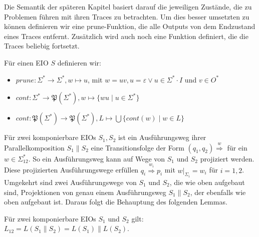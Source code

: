 Die Semantik der späteren Kapitel basiert darauf die jeweiligen Zustände, die
zu Problemen führen mit ihren Traces zu betrachten. Um dies besser umsetzten zu
können definieren wir eine prune-Funktion, die alle Outputs von dem Endzustand
eines Traces entfernt. Zusätzlich wird auch noch eine Funktion definiert, die
die Traces beliebig fortsetzt.

\begin{Def}
  Für einen EIO $S$ definieren wir:
  \begin{itemize}
    \item $prune:\Sigma ^*\rightarrow\Sigma ^*, w\mapsto u$, mit $w=uv,
      u=\varepsilon\vee u\in\Sigma ^*\cdot I$ und $v\in O^*$
    \item $cont:\Sigma ^*\rightarrow\mathfrak{P}(\Sigma ^*),
      w\mapsto\{wu\mid u\in\Sigma ^*\}$
    \item $cont:\mathfrak{P}(\Sigma ^*)\rightarrow\mathfrak{P}(\Sigma ^*),
      L\mapsto\bigcup\{cont(w)\mid w\in L\}$
  \end{itemize}
\end{Def}

Für zwei komponierbare EIOs $S_1, S_2$ ist ein Ausführungsweg ihrer
Parallelkomposition $S_1\| S_2$ eine Transitionsfolge der Form $(q_1,q_2)
\overset{w}{\Rightarrow}$ für ein $w\in\Sigma_{12}^*$. So ein Ausführungsweg
kann auf Wege von $S_1$ und $S_2$ projiziert werden. Diese projizierten
Ausführungswege erfüllen $q_i \overset{w_i}{\Rightarrow} p_i$ mit $w|_{\Sigma
_i}=w_i$ für $i=1,2$. Umgekehrt sind zwei Ausführungswege von $S_1$ und $S_2$,
die wie oben aufgebaut sind, Projektionen von genau einem Ausführungsweg
$S_1\|S_2$, der ebenfalls wie oben aufgebaut ist. Daraus folgt die Behauptung
des folgenden Lemmas.

\begin{lem}
  \label{LemmaSprache}
  Für zwei komponierbare EIOs $S_1$ und $S_2$ gilt: $L_{12} = L(S_1\|S_2) =
  L(S_1)\|L(S_2)$.
\end{lem}
